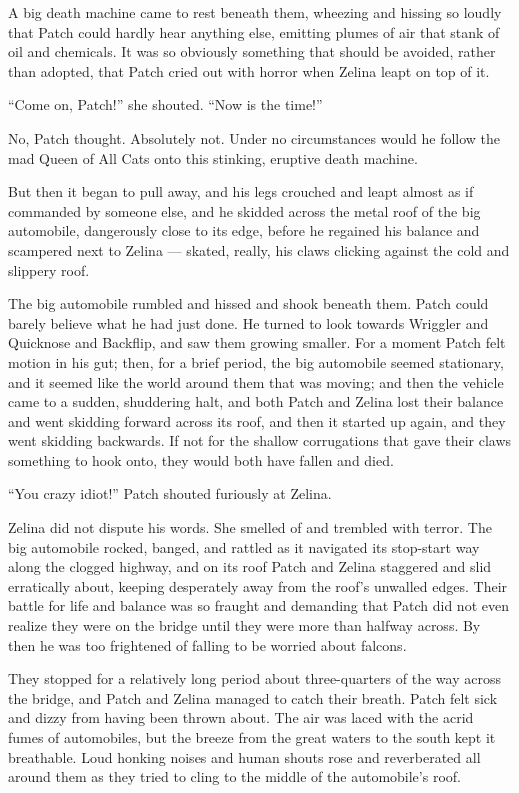 \documentclass[ebook,oneside,openany,12pt]{memoir}
\begin{document}
A big death machine came to rest beneath them, wheezing and hissing so
loudly that Patch could hardly hear anything else, emitting plumes of
air that stank of oil and chemicals. It was so obviously something
that should be avoided, rather than adopted, that Patch cried out with
horror when Zelina leapt on top of it.

“Come on, Patch!” she shouted. “Now is the time!”

No, Patch thought. Absolutely not. Under no circumstances would he
follow the mad Queen of All Cats onto this stinking, eruptive death
machine.

But then it began to pull away, and his legs crouched and leapt almost
as if commanded by someone else, and he skidded across the metal roof
of the big automobile, dangerously close to its edge, before he
regained his balance and scampered next to Zelina — skated, really,
his claws clicking against the cold and slippery roof.

The big automobile rumbled and hissed and shook beneath them. Patch
could barely believe what he had just done. He turned to look towards
Wriggler and Quicknose and Backflip, and saw them growing smaller. For
a moment Patch felt motion in his gut; then, for a brief period, the
big automobile seemed stationary, and it seemed like the world around
them that was moving; and then the vehicle came to a sudden,
shuddering halt, and both Patch and Zelina lost their balance and went
skidding forward across its roof, and then it started up again, and
they went skidding backwards. If not for the shallow corrugations that
gave their claws something to hook onto, they would both have fallen
and died.

“You crazy idiot!” Patch shouted furiously at Zelina.

Zelina did not dispute his words. She smelled of and trembled with
terror. The big automobile rocked, banged, and rattled as it navigated
its stop-start way along the clogged highway, and on its roof Patch
and Zelina staggered and slid erratically about, keeping desperately
away from the roof’s unwalled edges. Their battle for life and balance
was so fraught and demanding that Patch did not even realize they were
on the bridge until they were more than halfway across. By then he was
too frightened of falling to be worried about falcons.

They stopped for a relatively long period about three-quarters of the
way across the bridge, and Patch and Zelina managed to catch their
breath. Patch felt sick and dizzy from having been thrown about. The
air was laced with the acrid fumes of automobiles, but the breeze from
the great waters to the south kept it breathable. Loud honking noises
and human shouts rose and reverberated all around them as they tried
to cling to the middle of the automobile’s roof.
\end{document}
